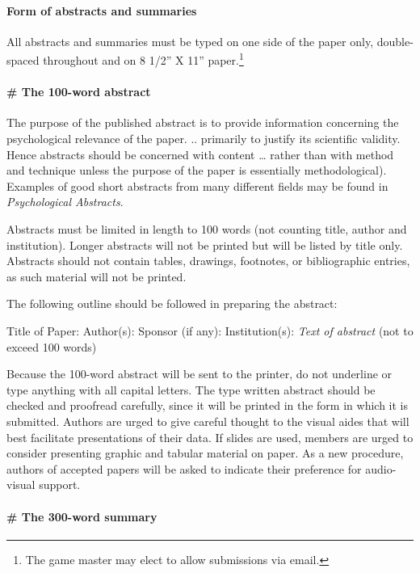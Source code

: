 \paragraph{Form of abstracts and summaries}
\label{formofabstractsandsummaries}

All abstracts and summaries must be typed on one side of the paper only, double-spaced throughout and on 8 1\slash 2” X 11” paper.\footnote{The game master may elect to allow submissions via email.}

\paragraph{\# The 100-word abstract}
\label{the100-wordabstract}

The purpose of the published abstract is to provide information concerning the psychological relevance of the paper. .. primarily to justify its scientific validity. Hence abstracts should be concerned with content … rather than with method and technique unless the purpose of the paper is essentially methodological). Examples of good short abstracts from many different fields may be found in \emph{Psychological Abstracts}.

Abstracts must be limited in length to 100 words (not counting title, author and institution). Longer abstracts will not be printed but will be listed by title only. Abstracts should not contain tables, drawings, footnotes, or bibliographic entries, as such material will not be printed.

The following outline should be followed in preparing the abstract:

Title of Paper:
Author(s): Sponsor (if any):
Institution(s):
 \emph{Text of abstract} (not to exceed 100 words)

Because the 100-word abstract will be sent to the printer, do not underline or type anything with all capital letters. The type written abstract should be checked and proofread carefully, since it will be printed in the form in which it is submitted. Authors are urged to give careful thought to the visual aides that will best facilitate presentations of their data. If slides are used, members are urged to consider presenting graphic and tabular material on paper. As a new procedure, authors of accepted papers will be asked to indicate their preference for audio-visual support.

\paragraph{\# The 300-word summary}
\label{the300-wordsummary}

